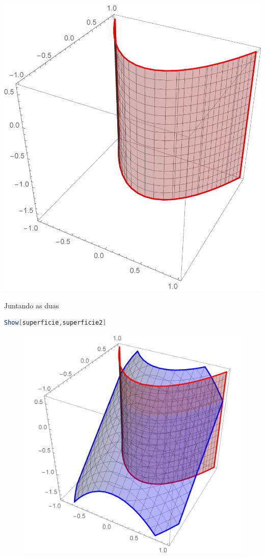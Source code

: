 \documentclass[a4paper, 12pt]{article}
\begin{document}
\begin{minipage}{.5\linewidth}
	\includegraphics[scale=.25]{images/ContourRed}
\end{minipage}

Juntando as duas

\begin{lstlisting}[language=Mathematica]
Show[superficie,superficie2]
\end{lstlisting}

\begin{figure}[!h]
	\centering
	\includegraphics[scale=.24]{images/Juntos}
\end{figure}
\end{document}
